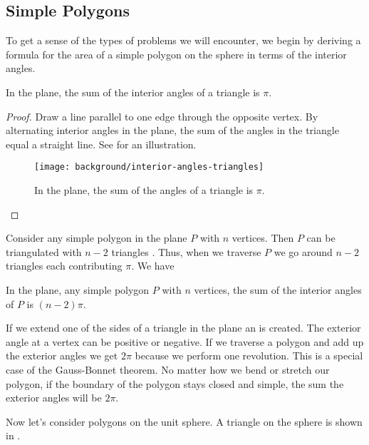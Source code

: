 \subsection{Simple Polygons}
\label{sec:warm-up}

To get a sense of the types of problems we will encounter,
we begin by deriving a formula for the area
of a simple polygon on the sphere in terms of the 
interior angles.
\begin{theorem}\label{thm:triangle}
In the plane, the sum of the interior angles of a triangle is $\pi$.
\end{theorem}
\begin{proof}
Draw a line parallel to one edge through the opposite vertex.
By alternating interior angles in the plane, the sum of the angles
in the triangle equal  a straight line.
See  for an illustration. 

\begin{figure}[htb]
\centering
\texttt{[image: background/interior-angles-triangles]}
\caption{In the plane, the sum of the angles of a triangle is $\pi$.}
\label{fig:angles}
\end{figure}

\end{proof}

Consider any simple polygon in the plane $P$ with $n$ vertices. 
Then $P$ can be triangulated with $n-2$ triangles \cite{orourke_computational_1994}.
Thus, when we traverse $P$ we go around $n-2$ triangles each contributing
$\pi$.
We have
\begin{corollary}\label{cor:angles}
In the plane, any simple polygon $P$ with $n$ vertices,
the sum of the interior angles of $P$ is $(n-2)\pi$.

\end{corollary}

If we extend one of the sides of a triangle in the plane
an  is created.
The exterior angle at a vertex can be positive or negative.
If we traverse a polygon and add up the exterior angles
we get $2\pi$ because we perform one revolution.
This is a special case of the Gauss-Bonnet theorem.
No matter how we bend or stretch our polygon,
if the boundary of the polygon stays closed and simple,
the sum the exterior angles will be $2\pi$.






Now let's consider polygons on the unit sphere.
A triangle on the sphere is shown in .

